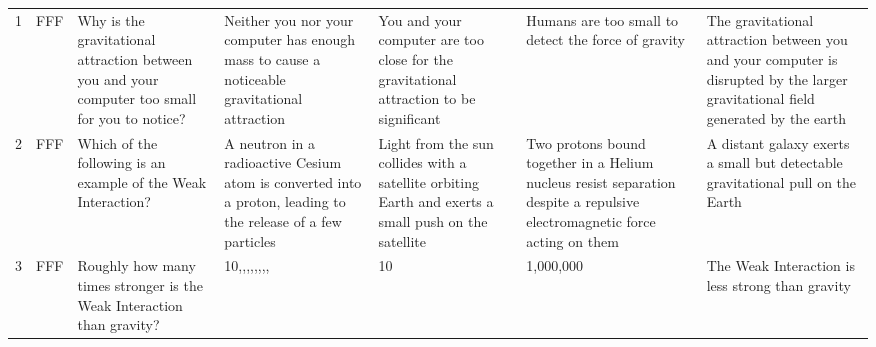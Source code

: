 \documentclass[10pt]{article}
\begin{document}
\begin{tiny}
\begin{longtable}{r P{0.3in} P{1.203in} P{0.8in} P{0.8in} P{0.8in} P{0.8in}}
    1     &     FFF &                                                                                                                                                                                   Why is the gravitational attraction between you and your computer too small for you to notice? &                                           Neither you nor your computer has enough mass to cause a noticeable gravitational attraction &                You and your computer are too close for the gravitational attraction to be significant &                                                                        Humans are too small to detect the force of gravity &  The gravitational attraction between you and your computer is disrupted by the larger gravitational field generated by the earth \\
    2     &     FFF &                                                                                                                                                                                                                    Which of the following is an example of the Weak Interaction? &                          A neutron in a radioactive Cesium atom is converted into a proton, leading to the release of a few particles &  Light from the sun collides with a satellite orbiting Earth and exerts a small push on the satellite &  Two protons bound together in a Helium nucleus resist separation despite a repulsive electromagnetic force acting on them &                                                   A distant galaxy exerts a small but detectable gravitational pull on the  Earth \\
    3     &     FFF &                                                                                                                                                                                                            Roughly how many times stronger is the Weak Interaction than gravity? &                                                                                                    10,,,,,,,, &                                                                                                    10 &                                                                                                                  1,000,000 &                                                                                  The Weak Interaction is less strong than gravity \\

\end{longtable}
\end{tiny}
\end{document}
